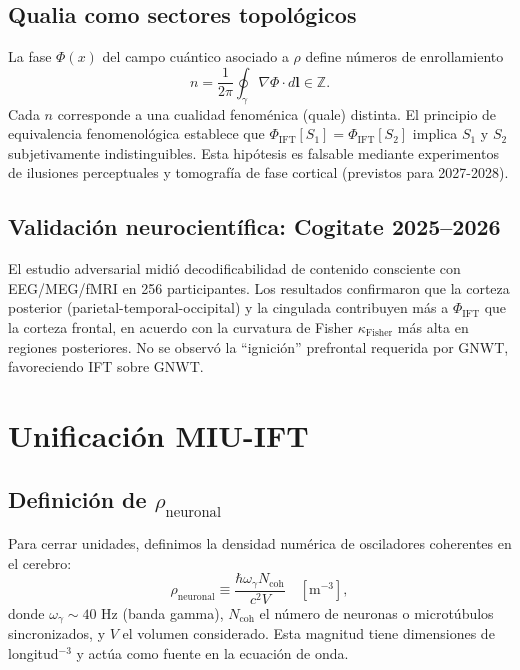 \documentclass[12pt, a4paper]{article}
\theoremstyle{miuThm}
\theoremstyle{remark}
\begin{document}
\subsection{Qualia como sectores topológicos}
La fase $\Phi(x)$ del campo cuántico asociado a $\rho$ define números de enrollamiento
\begin{equation}
n = \frac{1}{2\pi} \oint_\gamma \nabla\Phi \cdot d\mathbf{l} \in \mathbb{Z}.
\end{equation}
Cada $n$ corresponde a una cualidad fenoménica (quale) distinta. El principio de equivalencia fenomenológica establece que $\Phi_{\text{IFT}}[S_1] = \Phi_{\text{IFT}}[S_2]$ implica $S_1$ y $S_2$ subjetivamente indistinguibles. Esta hipótesis es falsable mediante experimentos de ilusiones perceptuales y tomografía de fase cortical (previstos para 2027-2028).


\subsection{Validación neurocientífica: Cogitate 2025--2026}
\label{subsec:cogitate}
El estudio adversarial \cite{Cogitate2026} midió decodificabilidad de contenido
consciente con EEG/MEG/fMRI en 256 participantes. Los resultados confirmaron que
la corteza posterior (parietal-temporal-occipital) y la cingulada contribuyen más
a $\Phi_{\text{IFT}}$ que la corteza frontal, en acuerdo con la curvatura de
Fisher $\kappa_{\text{Fisher}}$ más alta en regiones posteriores. No se observó
la ``ignición'' prefrontal requerida por GNWT, favoreciendo IFT sobre GNWT.

\clearpage
\section{Unificación MIU-IFT}
\label{sec:unificacion} 

\subsection{Definición de $\rho_{\text{neuronal}}$}
Para cerrar unidades, definimos la densidad numérica de osciladores coherentes en el cerebro:
\begin{equation}
\rho_{\text{neuronal}} \equiv \frac{\hbar \omega_\gamma N_{\text{coh}}}{c^2 V} \quad [\text{m}^{-3}],
\end{equation}
donde $\omega_\gamma \sim 40$ Hz (banda gamma), $N_{\text{coh}}$ el número de neuronas o microtúbulos sincronizados, y $V$ el volumen considerado. Esta magnitud tiene dimensiones de longitud$^{-3}$ y actúa como fuente en la ecuación de onda.
\end{document}
